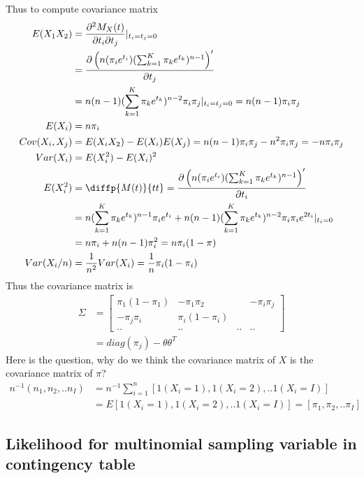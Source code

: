 \documentclass[11pt]{article} %
\begin{document}
	Thus to compute covariance matrix
	\begin{align*}
		E(X_1 X_2) &= \frac{\partial^2 M_X(t)}{\partial t_i \partial t_j}|_{t_i = t_j = 0}\\
		&= \frac{\partial \left(n(\pi_ie^{t_i})(\sum_{k=1}^K \pi_ke^{t_k})^{n-1} \right)'}{\partial t_j}\\
		&= n(n-1)(\sum_{k=1}^K \pi_ke^{t_k})^{n-2}\pi_i\pi_j|_{t_i = t_j = 0} = n(n-1)\pi_i\pi_j\\
		E(X_i) &= n\pi_i\\
		Cov(X_i, X_j) &= E(X_i X_2) - E(X_i)E(X_j) = n(n-1)\pi_i\pi_j - n^2 \pi_i\pi_j = -n\pi_i\pi_j\\
		Var(X_i) &= E(X_i^2) - E(X_i)^2 \\
		E(X_i^2) &= \diffp{M(t)}{t t} = \frac{\partial \left(n(\pi_ie^{t_i})(\sum_{k=1}^K \pi_ke^{t_k})^{n-1} \right)'}{\partial t_i}\\
		&= n(\sum_{k=1}^K \pi_ke^{t_k})^{n-1}\pi_i e^{t_i}+ n(n-1)(\sum_{k=1}^K \pi_ke^{t_k})^{n-2}\pi_i\pi_i e^{2t_i}|_{t_i = 0} \\
		&= n\pi_i + n(n-1)\pi_i^2 = n\pi_i(1-\pi)\\
		Var(X_i/n) &= \frac{1}{n^2} Var(X_i) = \frac{1}{n}\pi_i(1-\pi_i)
	\end{align*}
	Thus the covariance matrix is
	\begin{align*}
		\Sigma &= \begin{bmatrix}
			\pi_1(1-\pi_1) &  -\pi_1\pi_2&  & -\pi_i\pi_j \\
			-\pi_j\pi_i&  \pi_i(1-\pi_i)&   &  \\
			..& ..&..&..
		\end{bmatrix}\\
		&= diag{(\pi_j) - \theta \theta^T}
	\end{align*}
	Here is the question, why do we think the covariance matrix of $X$ is the covariance matrix of $\pi$?
	\begin{align*}
		n^{-1} (n_1, n_2, ..n_I) &= n^{-1} \sum_{i=1}^n[ 1 (X_{i}=1), 1 (X_{i}=2), ..1 (X_{i}=I)] \\
		&= E[1 (X_{i}=1), 1 (X_{i}=2), ..1 (X_{i}=I) ] = [\pi_1, \pi_2, .. \pi_I] 
	\end{align*}
	\subsection{Likelihood for multinomial sampling variable in contingency table}
	
\end{document}
